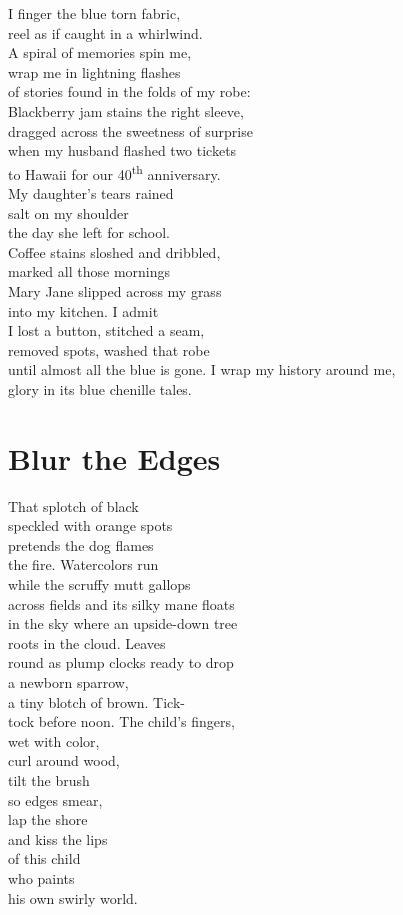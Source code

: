 \documentclass[twoside,10pt]{book}
\begin{document}
I finger the blue torn fabric,\\
reel as if caught in a whirlwind.\\
A spiral of memories spin me,\\
wrap me in lightning flashes\\
of stories found in the folds of my robe:\\
Blackberry jam stains the right sleeve,\\
dragged across the sweetness of surprise\\
when my husband flashed two tickets\\
to Hawaii for our 40\textsuperscript{th} anniversary.\\
My daughter's tears rained\\
salt on my shoulder\\
the day she left for school.\\
Coffee stains sloshed and dribbled,\\
marked all those mornings\\
Mary Jane slipped across my grass\\
into my kitchen. I admit\\
I lost a button, stitched a seam,\\
removed spots, washed that robe\\
until almost all the blue is gone.
\clearpage
I wrap my history around me,\\
glory in its blue chenille tales.


\clearpage
\section{Blur the Edges}

That splotch of black\\
speckled with orange spots\\
pretends the dog flames\\
the fire. Watercolors run\\
while the scruffy mutt gallops\\
across fields and its silky mane floats\\
in the sky where an upside-down tree\\
roots in the cloud. Leaves\\
round as plump clocks ready to drop\\
a newborn sparrow,\\
a tiny blotch of brown. Tick-\\
tock before noon. The child's fingers,\\
wet with color,\\
curl around wood,\\
tilt the brush\\
so edges smear,\\
lap the shore\\
and kiss the lips\\
of this child\\
who paints\\
his own swirly world.
\end{document}
